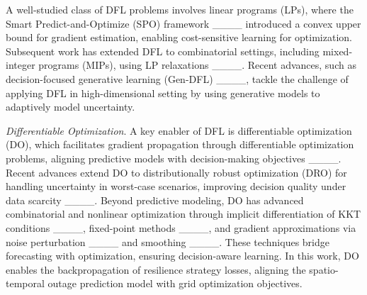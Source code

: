A well-studied class of DFL problems involves linear programs (LPs), where the Smart Predict-and-Optimize (SPO) framework ____ introduced a convex upper bound for gradient estimation, enabling cost-sensitive learning for optimization. Subsequent work has extended DFL to combinatorial settings, including mixed-integer programs (MIPs), using LP relaxations ____. 
Recent advances, such as decision-focused generative learning (Gen-DFL) ____, tackle the challenge of applying DFL in high-dimensional setting by using generative models to adaptively model uncertainty.

\vspace{.05in}
\noindent\emph{Differentiable Optimization}.
A key enabler of DFL is differentiable optimization (DO), which facilitates gradient propagation through differentiable optimization problems, aligning predictive models with decision-making objectives ____. Recent advances extend DO to distributionally robust optimization (DRO) for handling uncertainty in worst-case scenarios, improving decision quality under data scarcity ____. Beyond predictive modeling, DO has advanced combinatorial and nonlinear optimization through implicit differentiation of KKT conditions ____, fixed-point methods ____, and gradient approximations via noise perturbation ____ and smoothing ____. These techniques bridge forecasting with optimization, ensuring decision-aware learning. In this work, DO enables the backpropagation of resilience strategy losses, aligning the spatio-temporal outage prediction model with grid optimization objectives.
